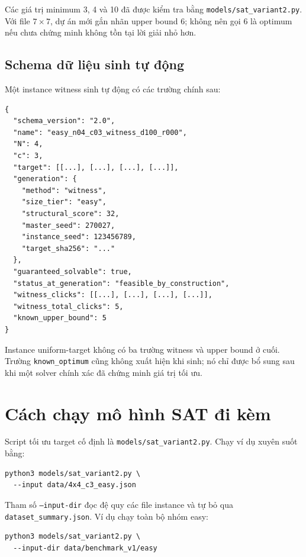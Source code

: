 \documentclass[11pt,a4paper]{article}
\begin{document}
Các giá trị minimum 3, 4 và 10 đã được kiểm tra bằng
\texttt{models/sat\_variant2.py}. Với file $7\times7$, dự án mới gắn nhãn
upper bound 6; không nên gọi 6 là optimum nếu chưa chứng minh không tồn tại
lời giải nhỏ hơn.

\subsection{Schema dữ liệu sinh tự động}

Một instance witness sinh tự động có các trường chính sau:

\begin{lstlisting}[style=jsonstyle,language={},caption={Schema JSON rút gọn của một instance witness.}]
{
  "schema_version": "2.0",
  "name": "easy_n04_c03_witness_d100_r000",
  "N": 4,
  "c": 3,
  "target": [[...], [...], [...], [...]],
  "generation": {
    "method": "witness",
    "size_tier": "easy",
    "structural_score": 32,
    "master_seed": 270027,
    "instance_seed": 123456789,
    "target_sha256": "..."
  },
  "guaranteed_solvable": true,
  "status_at_generation": "feasible_by_construction",
  "witness_clicks": [[...], [...], [...], [...]],
  "witness_total_clicks": 5,
  "known_upper_bound": 5
}
\end{lstlisting}

Instance uniform-target không có ba trường witness và upper bound ở cuối.
Trường \texttt{known\_optimum} cũng không xuất hiện khi sinh; nó chỉ được
bổ sung sau khi một solver chính xác đã chứng minh giá trị tối ưu.

\clearpage
\section{Cách chạy mô hình SAT đi kèm}\label{sec:run}

Script tối ưu target cố định là
\texttt{models/sat\_variant2.py}. Chạy ví dụ xuyên suốt bằng:

\begin{lstlisting}[style=jsonstyle,language={}]
python3 models/sat_variant2.py \
  --input data/4x4_c3_easy.json
\end{lstlisting}

Tham số \texttt{--input-dir} đọc đệ quy các file instance và tự bỏ qua
\texttt{dataset\_summary.json}. Ví dụ chạy toàn bộ nhóm easy:

\begin{lstlisting}[style=jsonstyle,language={}]
python3 models/sat_variant2.py \
  --input-dir data/benchmark_v1/easy
\end{lstlisting}
\end{document}
